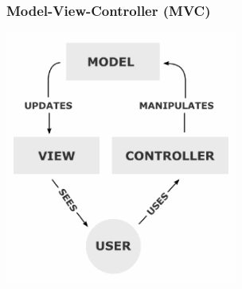 \documentclass{beamer}
\begin{document}
\begin{frame}
  \frametitle{Model-View-Controller (MVC)}
  \centering
  \includegraphics[width=3in]{mvc.png}\\
\end{frame}
\end{document}
